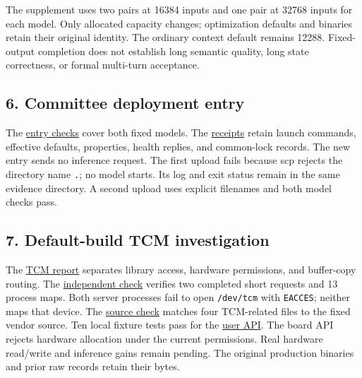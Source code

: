 \documentclass[10pt,a4paper]{article}
\begin{document}
The supplement uses two pairs at 16384 inputs and one pair at 32768
inputs for each model. Only allocated capacity changes; optimization
defaults and binaries retain their original identity. The ordinary
context default remains 12288. Fixed-output completion does not
establish long semantic quality, long state correctness, or formal
multi-turn acceptance.

\hypertarget{committee-deployment-entry}{%
\subsection{6. Committee deployment
entry}\label{committee-deployment-entry}}

The
\href{https://github.com/MoyaMryia/riscv-accl/blob/main/spacemit/reports/raw/k1-committee-entry-20261016-r1/smoke-summary.json}{entry
checks} cover both fixed models. The
\href{https://github.com/MoyaMryia/riscv-accl/blob/main/spacemit/reports/raw/k1-committee-entry-20261016-r1/receipts.json}{receipts}
retain launch commands, effective defaults, properties, health replies,
and common-lock records. The new entry sends no inference request. The
first upload fails because scp rejects the directory name \nolinkurl{.};
no model starts. Its log and exit status remain in the same evidence
directory. A second upload uses explicit filenames and both model checks
pass.

\hypertarget{default-build-tcm-investigation}{%
\subsection{7. Default-build TCM
investigation}\label{default-build-tcm-investigation}}

The
\href{https://github.com/MoyaMryia/riscv-accl/blob/main/spacemit/reports/2026-10-16-final-release-tcm.md}{TCM
report} separates library access, hardware permissions, and buffer-copy
routing. The
\href{https://github.com/MoyaMryia/riscv-accl/blob/main/spacemit/reports/raw/k1-tcm-final-release-20261016-r1/verification.json}{independent
check} verifies two completed short requests and 13 process maps. Both
server processes fail to open \nolinkurl{/dev/tcm} with
\nolinkurl{EACCES}; neither maps that device. The
\href{https://github.com/MoyaMryia/riscv-accl/blob/main/spacemit/reports/raw/k1-tcm-final-release-20261016-r1/source-audit.json}{source
check} matches four TCM-related files to the fixed vendor source. Ten
local fixture tests pass for the
\href{https://github.com/MoyaMryia/riscv-accl/blob/main/spacemit/tcm/README.md}{user
API}. The board API rejects hardware allocation under the current
permissions. Real hardware read/write and inference gains remain
pending. The original production binaries and prior raw records retain
their bytes.
\end{document}
